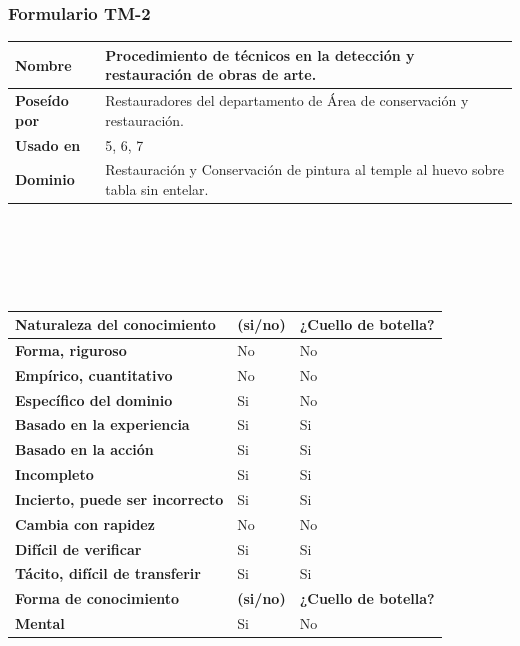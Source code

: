 \documentclass[a4paper,11pt]{article}
\begin{document}
			\subsubsection{Formulario TM-2}
			\begin{center}
				\begin{tabular}{| p{3cm} | p{8.85cm} |}
					\hline
					\textbf{Nombre} & Procedimiento de técnicos en la detección y restauración
					de obras de arte.\\
					\hline
					\textbf{Poseído por} & Restauradores del departamento de Área de
					conservación y restauración.\\
					\hline
					\textbf{Usado en} & 5, 6, 7\\
					\hline
					\textbf{Dominio} & Restauración y Conservación de pintura al temple al
					huevo sobre tabla sin entelar.\\
					\hline
				\end{tabular}
				\\
				\textbf{}
				\\
				\\
				\textbf{}
				\\
				\begin{tabular}{| p{6.3cm} | l | p{3.8cm} |}
					\hline
					\textbf{Naturaleza del conocimiento} & \textbf{(si/no)} & \textbf{¿Cuello
					de botella?}\\
					\hline
					\textbf{Forma, riguroso} & No & No\\
					\hline
					\textbf{Empírico, cuantitativo} & No & No\\
					\hline
					\textbf{Específico del dominio} & Si & No\\
					\hline
					\textbf{Basado en la experiencia} & Si & Si \\
					\hline
					\textbf{Basado en la acción} & Si & Si \\
					\hline
					\textbf{Incompleto} & Si & Si \\
					\hline
					\textbf{Incierto, puede ser incorrecto} & Si & Si \\
					\hline
					\textbf{Cambia con rapidez} & No & No\\
					\hline
					\textbf{Difícil de verificar} & Si & Si \\
					\hline
					\textbf{Tácito, difícil de transferir} & Si & Si \\
					\hline
					\textbf{Forma de conocimiento} & \textbf{(si/no)} & \textbf{¿Cuello
					de botella?}\\
					\hline
					\textbf{Mental} & Si & No\\

\end{tabular}
\end{center}
\end{document}
